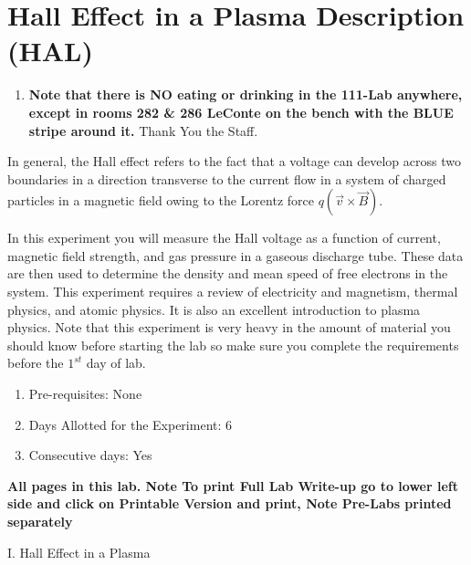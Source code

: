 \documentclass{../lab}
\begin{document}
\maketitle

\tableofcontents

\section{Hall Effect in a Plasma Description (HAL)}

\begin{enumerate}
    \item \textbf{Note that there is NO eating or drinking in the 111-Lab anywhere, except in rooms 282 \& 286 LeConte on the bench with the BLUE stripe around it.} Thank You the Staff.
\end{enumerate}

In general, the Hall effect refers to the fact that a voltage can develop across two boundaries in a direction transverse to the current flow in a system of charged particles in a magnetic field owing to the Lorentz force $q (\vec{v} \times \vec{B})$.

In this experiment you will measure the Hall voltage as a function of current, magnetic field strength, and gas pressure in a gaseous discharge tube. These data are then used to determine the density and mean speed of free electrons in the system. This experiment requires a review of electricity and magnetism, thermal physics, and atomic physics. It is also an excellent introduction to plasma physics. Note that this experiment is very heavy in the amount of material you should know before starting the lab so make sure you complete the requirements before the $1^{st}$ day of lab.

\begin{enumerate}
    \item Pre-requisites: None

    \item Days Allotted for the Experiment: 6

    \item Consecutive days: Yes

\end{enumerate}

\textbf{All pages in this lab. Note To print Full Lab Write-up go to lower left side and click on Printable Version and print, Note Pre-Labs printed separately }

I. Hall Effect in a Plasma
\end{document}
